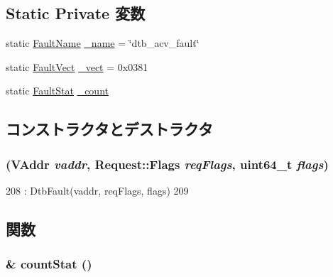 \subsection*{Static Private 変数}
\begin{DoxyCompactItemize}
\item 
static \hyperlink{sim_2faults_8hh_abb196df64725e5c2568c900cf130d8d7}{FaultName} \hyperlink{classAlphaISA_1_1DtbAcvFault_ac79073ffcd2c66a09bcd3bd3ad206019}{\_\-name} = \char`\"{}dtb\_\-acv\_\-fault\char`\"{}
\item 
static \hyperlink{classm5_1_1params_1_1Addr}{FaultVect} \hyperlink{classAlphaISA_1_1DtbAcvFault_ad9e5855b9db0b2824cf6c507be4a872e}{\_\-vect} = 0x0381
\item 
static \hyperlink{classStats_1_1Scalar}{FaultStat} \hyperlink{classAlphaISA_1_1DtbAcvFault_a4bff925c412f331c5aaf6a39b79619ff}{\_\-count}
\end{DoxyCompactItemize}


\subsection{コンストラクタとデストラクタ}
\hypertarget{classAlphaISA_1_1DtbAcvFault_afa7cdcdb1879c2258aa8ffd15b82c5a0}{
\subsubsection[{DtbAcvFault}]{ ({\bf VAddr} {\em vaddr}, \/  {\bf Request::Flags} {\em reqFlags}, \/  uint64\_\-t {\em flags})}}
\label{classAlphaISA_1_1DtbAcvFault_afa7cdcdb1879c2258aa8ffd15b82c5a0}



\begin{DoxyCode}
208         : DtbFault(vaddr, reqFlags, flags)
209     { }
\end{DoxyCode}


\subsection{関数}
\hypertarget{classAlphaISA_1_1DtbAcvFault_a6c79663c761ff57265459f7e3aefaf4c}{
\subsubsection[{countStat}]{\& countStat ()}}
\label{classAlphaISA_1_1DtbAcvFault_a6c79663c761ff57265459f7e3aefaf4c}


